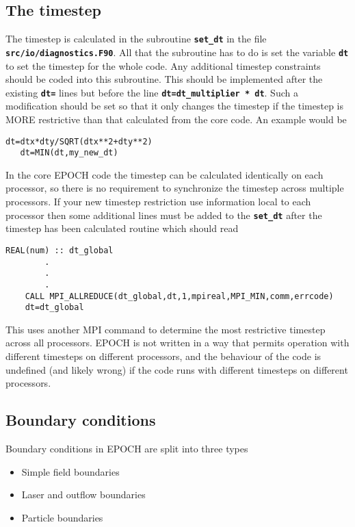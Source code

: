 \documentclass[12pt]{article}
\newcommand{\simpleboxverbatim}{\begin{Verbatim}[obeytabs=true,frame=single,
  framerule=0.5mm,rulecolor=\color{warwickmid}]}
\newcommand{\inlinecode}[1]{{\color{warwickred} \bf\texttt{#1}}}
\newcommand{\EPOCH}{{\color{warwickdark}\fontfamily{phv}\selectfont EPOCH} }
\begin{document}
\subsection{The timestep}

The timestep is calculated in the subroutine \inlinecode{set\_dt} in the file
\inlinecode{src/io/diagnostics.F90}. All that the subroutine has to do is set
the variable \inlinecode{dt} to set the timestep for the whole code. Any
additional timestep constraints should be coded into this subroutine. This
should be implemented after the existing \inlinecode{dt=} lines but before the
line \inlinecode{dt=dt\_multiplier * dt}. Such a modification should be set so
that it only changes the timestep if the timestep is MORE restrictive than that
calculated from the core code. An example would be

\simpleboxverbatim
   dt=dtx*dty/SQRT(dtx**2+dty**2)
   dt=MIN(dt,my_new_dt)
\end{Verbatim}

In the core \EPOCH code the timestep can be calculated identically on each
processor, so there is no requirement to synchronize the timestep across
multiple processors. If your new timestep restriction use information local to
each processor then some additional lines must be added to the
\inlinecode{set\_dt} after the timestep has been calculated routine which
should read

\simpleboxverbatim
	REAL(num) :: dt_global
		.
		.
		.
	CALL MPI_ALLREDUCE(dt_global,dt,1,mpireal,MPI_MIN,comm,errcode)
	dt=dt_global
\end{Verbatim}

This uses another MPI command to determine the most restrictive timestep across
all processors. \EPOCH is not written in a way that permits operation with
different timesteps on different processors, and the behaviour of the code is
undefined (and likely wrong) if the code runs with different timesteps on
different processors.

\pagebreak

\subsection{Boundary conditions}
Boundary conditions in \EPOCH are split into three types
\begin{itemize}
\item Simple field boundaries
\item Laser and outflow boundaries
\item Particle boundaries
\end{itemize}
\end{document}
